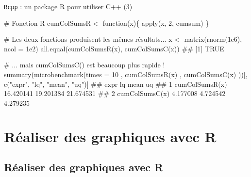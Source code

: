\documentclass[12pt,handout,ignorenonframetext,]{beamer}
\newenvironment{Shaded}{}{}
\newcommand{\KeywordTok}[1]{\textcolor[rgb]{0.00,0.00,1.00}{{#1}}}
\newcommand{\DataTypeTok}[1]{{#1}}
\newcommand{\DecValTok}[1]{{#1}}
\newcommand{\FloatTok}[1]{{#1}}
\newcommand{\StringTok}[1]{\textcolor[rgb]{0.00,0.50,0.50}{{#1}}}
\newcommand{\CommentTok}[1]{\textcolor[rgb]{0.00,0.50,0.00}{{#1}}}
\newcommand{\NormalTok}[1]{{#1}}
\renewenvironment{Shaded}{\begin{snugshade}}{\end{snugshade}}
\begin{document}
\begin{frame}[fragile]{\texttt{Rcpp} : un package R pour utiliser C++
(3)}

\footnotesize

\begin{Shaded}
\begin{Highlighting}[]
\CommentTok{# Fonction R}
\NormalTok{cumColSumsR <-}\StringTok{ }\NormalTok{function(x)\{}
  \KeywordTok{apply}\NormalTok{(x, }\DecValTok{2}\NormalTok{, cumsum)}
\NormalTok{\}}

\CommentTok{# Les deux fonctions produisent les mêmes résultats...}
\NormalTok{x <-}\StringTok{ }\KeywordTok{matrix}\NormalTok{(}\KeywordTok{rnorm}\NormalTok{(}\FloatTok{1e6}\NormalTok{), }\DataTypeTok{ncol =} \FloatTok{1e2}\NormalTok{)}
\KeywordTok{all.equal}\NormalTok{(}\KeywordTok{cumColSumsR}\NormalTok{(x), }\KeywordTok{cumColSumsC}\NormalTok{(x))}
  \NormalTok{## [1] TRUE}

\CommentTok{# ... mais cumColSumsC() est beaucoup plus rapide !}
\KeywordTok{summary}\NormalTok{(}\KeywordTok{microbenchmark}\NormalTok{(}\DataTypeTok{times =} \DecValTok{10}
  \NormalTok{, }\KeywordTok{cumColSumsR}\NormalTok{(x)}
  \NormalTok{, }\KeywordTok{cumColSumsC}\NormalTok{(x)}
\NormalTok{))[, }\KeywordTok{c}\NormalTok{(}\StringTok{"expr"}\NormalTok{, }\StringTok{"lq"}\NormalTok{, }\StringTok{"mean"}\NormalTok{, }\StringTok{"uq"}\NormalTok{)]}
  \NormalTok{##             expr        lq      mean        uq}
  \NormalTok{## 1 cumColSumsR(x) 16.420141 19.201384 21.674531}
  \NormalTok{## 2 cumColSumsC(x)  4.177008  4.724542  4.279235}
\end{Highlighting}
\end{Shaded}

\end{frame}

\section{Réaliser des graphiques avec
R}\label{realiser-des-graphiques-avec-r}

\subsection*{Réaliser des graphiques avec R}
\end{document}
